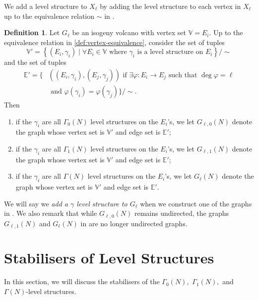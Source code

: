 \documentclass[11pt,a4paper]{amsart}
\theoremstyle{plain}
\theoremstyle{definition}
\newtheorem{defn}[thm]{Definition}
\theoremstyle{remark}
\begin{document}
We add a level structure to $X_{\ell}$ by adding the level structure to each vertex in $X_{\ell}$ up to the equivalence relation $\sim$ in .
\begin{defn}\label{defn:level-struct-volcanoes}
  Let $G_{\ell}$ be an isogeny volcano with vertex set $\mathbb{V} = {E_i}$. Up to the equivalence relation in \cref{def:vertex-equivalence}, consider the set of tuples
  \[
    \mathbb{V}' = \left\{(E_i, \gamma_i) \mid \forall E_i \in \mathbb{V} \text{ where } \gamma_i \text{ is a level structure on } E_i \right\} / \sim
  \]
  and the set of tuples
  \begin{align*}
    \mathbb{E}' = \bigl\{&((E_i, \gamma_i), (E_j, \gamma_j)) \text{ if } \exists \varphi: E_i \to E_j \text{ such that } \deg\varphi = \ell\\
    & \text{ and } \varphi(\gamma_i) = \varphi(\gamma_j) \bigr\} \big/ \sim.
  \end{align*}
  Then
  \begin{enumerate}[label=(\roman*)]
  \item if the $\gamma_i$ are all $\Gamma_0(N)$ level structures on the $E_i$'s, we let $G_{\ell,0}(N)$ denote the graph whose vertex set is $\mathbb{V}'$ and edge set is $\mathbb{E}'$;
  \item if the $\gamma_i$ are all $\Gamma_1(N)$ level structures on the $E_i$'s, we let $G_{\ell,1}(N)$ denote the graph whose vertex set is $\mathbb{V}'$ and edge set is $\mathbb{E}'$;

  \item if the $\gamma_i$ are all $\Gamma(N)$ level structures on the $E_i$'s, we let $G_{\ell}(N)$ denote the graph whose vertex set is $\mathbb{V}'$ and edge set is $\mathbb{E}'$.
  \end{enumerate}
\end{defn}
We will say we \emph{add a $\gamma$ level structure to $G_{\ell}$} when we construct one of the graphs in . We also remark that while $G_{\ell,0}(N)$ remains undirected, the  graphs $G_{\ell,1}(N)$ and $G_{\ell}(N)$ in  are no longer undirected graphs.
\section{Stabilisers of Level Structures}\label{sec:stabilisers}
In this section, we will discuss the stabilisers of the $\Gamma_0(N),$ $\Gamma_1(N),$ and $\Gamma(N)$-level structures.
\end{document}

